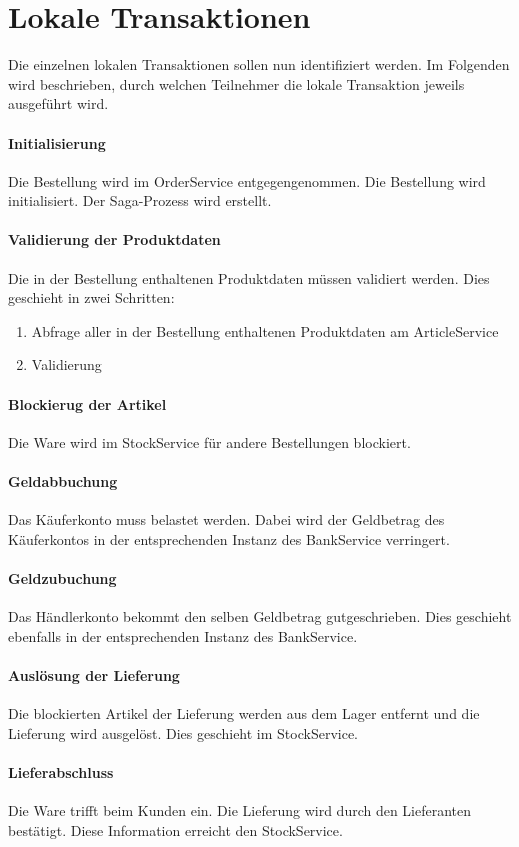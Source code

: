 \section{Lokale Transaktionen}
Die einzelnen lokalen Transaktionen sollen nun identifiziert werden. Im Folgenden wird beschrieben, durch welchen Teilnehmer die lokale Transaktion jeweils ausgeführt wird. 

\paragraph*{Initialisierung} 
Die Bestellung wird im OrderService entgegengenommen. Die Bestellung wird initialisiert. Der Saga-Prozess wird erstellt. 

\paragraph*{Validierung der Produktdaten}
Die in der Bestellung enthaltenen Produktdaten müssen validiert werden. Dies geschieht in zwei Schritten:
\begin{enumerate}
	\item Abfrage aller in der Bestellung enthaltenen Produktdaten am ArticleService
	\item Validierung
\end{enumerate}

\paragraph*{Blockierug der Artikel}
Die Ware wird im StockService für andere Bestellungen blockiert. 

\paragraph*{Geldabbuchung}
Das Käuferkonto muss belastet werden. Dabei wird der Geldbetrag des Käuferkontos in der entsprechenden Instanz des BankService verringert.

\paragraph*{Geldzubuchung}
Das Händlerkonto bekommt den selben Geldbetrag gutgeschrieben. Dies geschieht ebenfalls in der entsprechenden Instanz des BankService. 

\paragraph*{Auslösung der Lieferung}
Die blockierten Artikel der Lieferung werden aus dem Lager entfernt und die Lieferung wird ausgelöst. Dies geschieht im StockService.

\paragraph*{Lieferabschluss}
Die Ware trifft beim Kunden ein. Die Lieferung wird durch den Lieferanten bestätigt. Diese Information erreicht den StockService.
